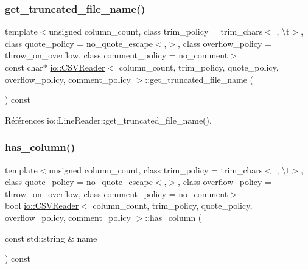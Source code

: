 \subsubsection{\texorpdfstring{get\+\_\+truncated\+\_\+file\+\_\+name()}{get\_truncated\_file\_name()}}
{\footnotesize\ttfamily template$<$unsigned column\+\_\+count, class trim\+\_\+policy  = trim\+\_\+chars$<$\textquotesingle{} \textquotesingle{}, \textquotesingle{}\textbackslash{}t\textquotesingle{}$>$, class quote\+\_\+policy  = no\+\_\+quote\+\_\+escape$<$\textquotesingle{},\textquotesingle{}$>$, class overflow\+\_\+policy  = throw\+\_\+on\+\_\+overflow, class comment\+\_\+policy  = no\+\_\+comment$>$ \\
const char$\ast$ \hyperlink{classio_1_1CSVReader}{io\+::\+C\+S\+V\+Reader}$<$ column\+\_\+count, trim\+\_\+policy, quote\+\_\+policy, overflow\+\_\+policy, comment\+\_\+policy $>$\+::get\+\_\+truncated\+\_\+file\+\_\+name (\begin{DoxyParamCaption}{ }\end{DoxyParamCaption}) const\hspace{0.3cm}{\ttfamily [inline]}}



Références io\+::\+Line\+Reader\+::get\+\_\+truncated\+\_\+file\+\_\+name().

\mbox{\label{classio_1_1CSVReader_aaba91fff6faea12e451943e8d32a5a17}} 
\subsubsection{\texorpdfstring{has\+\_\+column()}{has\_column()}}
{\footnotesize\ttfamily template$<$unsigned column\+\_\+count, class trim\+\_\+policy  = trim\+\_\+chars$<$\textquotesingle{} \textquotesingle{}, \textquotesingle{}\textbackslash{}t\textquotesingle{}$>$, class quote\+\_\+policy  = no\+\_\+quote\+\_\+escape$<$\textquotesingle{},\textquotesingle{}$>$, class overflow\+\_\+policy  = throw\+\_\+on\+\_\+overflow, class comment\+\_\+policy  = no\+\_\+comment$>$ \\
bool \hyperlink{classio_1_1CSVReader}{io\+::\+C\+S\+V\+Reader}$<$ column\+\_\+count, trim\+\_\+policy, quote\+\_\+policy, overflow\+\_\+policy, comment\+\_\+policy $>$\+::has\+\_\+column (\begin{DoxyParamCaption}\item[{const std\+::string \&}]{name }\end{DoxyParamCaption}) const\hspace{0.3cm}{\ttfamily [inline]}}


